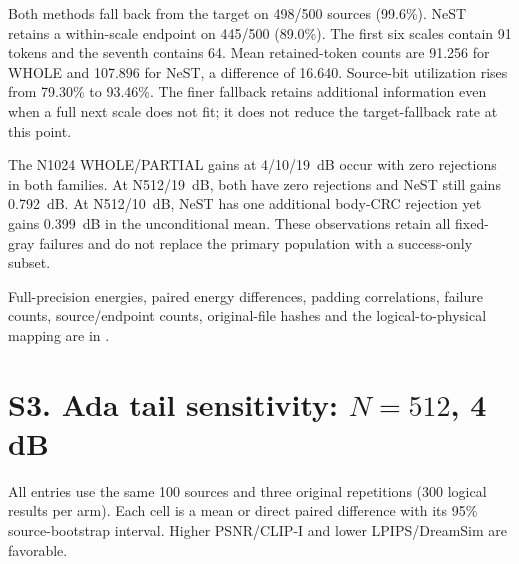 \documentclass[11pt,letterpaper]{article}
\begin{document}
Both methods fall back from the target on 498/500 sources (99.6\%). NeST retains a within-scale endpoint on 445/500 (89.0\%). The first six scales contain 91 tokens and the seventh contains 64. Mean retained-token counts are 91.256 for WHOLE and 107.896 for NeST, a difference of 16.640. Source-bit utilization rises from 79.30\% to 93.46\%. The finer fallback retains additional information even when a full next scale does not fit; it does not reduce the target-fallback rate at this point.

The N1024 WHOLE/PARTIAL gains at 4/10/19~dB occur with zero rejections in both families. At N512/19~dB, both have zero rejections and NeST still gains 0.792~dB. At N512/10~dB, NeST has one additional body-CRC rejection yet gains 0.399~dB in the unconditional mean. These observations retain all fixed-gray failures and do not replace the primary population with a success-only subset.

Full-precision energies, paired energy differences, padding correlations, failure counts, source/endpoint counts, original-file hashes and the logical-to-physical mapping are in
.




\clearpage\section*{S3. Ada tail sensitivity: $N=512$, 4 dB}
All entries use the same 100 sources and three original repetitions (300 logical results per arm). Each cell is a mean or direct paired difference with its 95\% source-bootstrap interval. Higher PSNR/CLIP-I and lower LPIPS/DreamSim are favorable.
\end{document}
